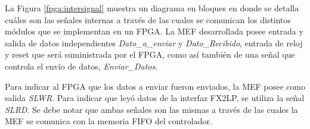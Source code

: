 	La Figura \ref{fpga:intersignal} muestra un diagrama en bloques en donde se detalla cuáles son las señales internas a través de las cuales se comunican los distintos módulos que se implementan en un FPGA. La MEF desarrollada posee entrada y salida de datos independientes \textit{Dato\_a\_enviar} y \textit{Dato\_Recibido}, entrada de reloj y reset que será suministrada por el FPGA, como así también de una señal que controla el envío de datos, \textit{Enviar\_Datos}.
	
	Para indicar al FPGA que los datos a enviar fueron enviados, la MEF posee como salida \textit{SLWR}. Para indicar que leyó datos de la interfaz FX2LP, se utiliza la señal \textit{SLRD}. Se debe notar que ambas señales son las mismas a través de las cuales la MEF se comunica con la memoria FIFO del controlador.
	


	
	
	
